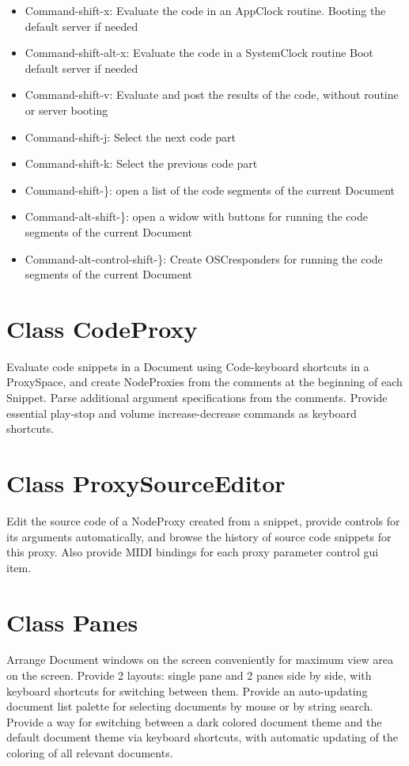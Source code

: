 \documentclass[11pt, a4paper]{scrartcl}
\begin{document}
\begin{itemize}
\item Command-shift-x: Evaluate the code in an AppClock routine. Booting the default server if needed
\item Command-shift-alt-x: Evaluate the code in a SystemClock routine Boot default server if needed
\item Command-shift-v: Evaluate and post the results of the code, without routine or server booting
\item Command-shift-j: Select the next code part
\item Command-shift-k: Select the previous code part
\item Command-shift-\}: open a list of the code segments of the current Document
\item Command-alt-shift-\}: open a widow with buttons for running the code segments of the current Document
\item Command-alt-control-shift-\}: Create OSCresponders for running the code segments of the current Document
\end{itemize}
\section*{Class CodeProxy}
\label{sec-8}


Evaluate code snippets in a Document using Code-keyboard shortcuts in a ProxySpace, and create NodeProxies from the comments at the beginning of each Snippet. Parse additional argument specifications from the comments.  Provide essential play-stop and volume increase-decrease commands as keyboard shortcuts. 
\section*{Class ProxySourceEditor}
\label{sec-9}


Edit the source code of a NodeProxy created from a snippet, provide controls for its arguments automatically, and browse the history of source code snippets for this proxy.  Also provide MIDI bindings for each proxy parameter control gui item. 
\section*{Class Panes}
\label{sec-10}


Arrange Document windows on the screen conveniently for maximum view area on the screen. Provide 2 layouts: single pane and 2 panes side by side, with keyboard shortcuts for switching between them. Provide an auto-updating document list palette for selecting documents by mouse or by string search. Provide a way for switching between a dark colored document theme and the default document theme via keyboard shortcuts, with automatic updating of the coloring of all relevant documents. 
\end{document}
